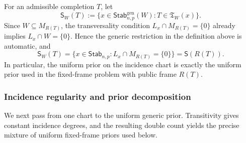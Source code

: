 \documentclass[11pt]{article}
\newcommand{\1}{\mathbf 1}
\theoremstyle{plain}
\theoremstyle{definition}
\theoremstyle{remark}
\begin{document}
For an admissible completion $T$, let
\begin{equation}
 \mathsf S_W(T):=\{x\in\mathsf{Stab}_{n,p}^{\mathrm{gen}}(W):
 T\in\mathfrak T_W(x)\}.
 \label{eq:fixed-W-incidence-chart}
\end{equation}
Since $W\subseteq M_{R(T)}$, the transversality condition
$L_x\cap M_{R(T)}=\{0\}$ already implies $L_x\cap W=\{0\}$.  Hence the
generic restriction in the definition above is automatic, and
\begin{equation}
 \mathsf S_W(T)
 =\{x\in\mathsf{Stab}_{n,p}:L_x\cap M_{R(T)}=\{0\}\}
 =\mathsf S(R(T)).
 \label{eq:fixed-W-incidence-chart-equality}
\end{equation}
In particular, the uniform prior on the incidence chart is exactly the
uniform prior used in the fixed-frame problem with public frame $R(T)$.

\subsubsection{Incidence regularity and prior decomposition}
\label{subsubsec:transverse-incidence-regularity}

We next pass from one chart to the uniform generic prior. Transitivity gives constant incidence degrees, and the resulting double count yields the precise mixture of uniform fixed-frame priors used below.
\end{document}
